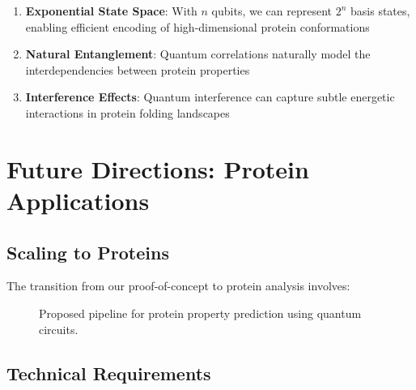 \documentclass[11pt,a4paper]{article}
\begin{document}
\begin{enumerate}
    \item \textbf{Exponential State Space}: With $n$ qubits, we can represent $2^n$ basis states, enabling efficient encoding of high-dimensional protein conformations
    \item \textbf{Natural Entanglement}: Quantum correlations naturally model the interdependencies between protein properties
    \item \textbf{Interference Effects}: Quantum interference can capture subtle energetic interactions in protein folding landscapes
\end{enumerate}

\section{Future Directions: Protein Applications}

\subsection{Scaling to Proteins}

The transition from our proof-of-concept to protein analysis involves:

\begin{figure}[h]
\centering
{}
\caption{Proposed pipeline for protein property prediction using quantum circuits.}
\label{fig:protein_pipeline}
\end{figure}

\subsection{Technical Requirements}
\end{document}
